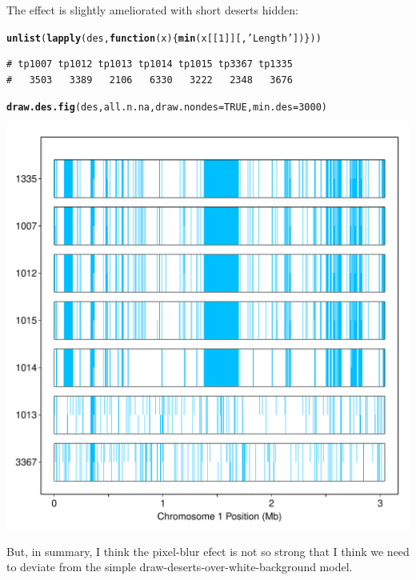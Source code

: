 \documentclass{article}\usepackage[]{graphicx}\usepackage[]{color}
\makeatletter
\def\maxwidth{ %
  \ifdim\Gin@nat@width>\linewidth
    \linewidth
  \else
    \Gin@nat@width
  \fi
}
\newcommand{\hlnum}[1]{\textcolor[rgb]{0.686,0.059,0.569}{#1}}%
\newcommand{\hlstr}[1]{\textcolor[rgb]{0.192,0.494,0.8}{#1}}%
\newcommand{\hlstd}[1]{\textcolor[rgb]{0.345,0.345,0.345}{#1}}%
\newcommand{\hlkwa}[1]{\textcolor[rgb]{0.161,0.373,0.58}{\textbf{#1}}}%
\newcommand{\hlkwc}[1]{\textcolor[rgb]{0.333,0.667,0.333}{#1}}%
\newcommand{\hlkwd}[1]{\textcolor[rgb]{0.737,0.353,0.396}{\textbf{#1}}}%
\newenvironment{kframe}{%
 \def\at@end@of@kframe{}%
 \ifinner\ifhmode%
  \def\at@end@of@kframe{\end{minipage}}%
  \begin{minipage}{\columnwidth}%
 \fi\fi%
 \def\FrameCommand##1{\hskip\@totalleftmargin \hskip-\fboxsep
 \colorbox{shadecolor}{##1}\hskip-\fboxsep
     \hskip-\linewidth \hskip-\@totalleftmargin \hskip\columnwidth}%
 \MakeFramed {\advance\hsize-\width
   \@totalleftmargin\z@ \linewidth\hsize
   \@setminipage}}%
 {\par\unskip\endMakeFramed%
 \at@end@of@kframe}
\newenvironment{knitrout}{}{} %
\makeatother
\begin{document}
The effect is slightly ameliorated with short deserts hidden:

\begin{knitrout}\footnotesize
{}\color{fgcolor}\begin{kframe}
\begin{alltt}
\hlkwd{unlist}\hlstd{(}\hlkwd{lapply}\hlstd{(des,}\hlkwa{function}\hlstd{(}\hlkwc{x}\hlstd{)\{}\hlkwd{min}\hlstd{(x[[}\hlnum{1}\hlstd{]][,}\hlstr{'Length'}\hlstd{])\}))}
\end{alltt}
\begin{verbatim}
# tp1007 tp1012 tp1013 tp1014 tp1015 tp3367 tp1335 
#   3503   3389   2106   6330   3222   2348   3676
\end{verbatim}
\begin{alltt}
\hlkwd{draw.des.fig}\hlstd{(des, all.n.na,} \hlkwc{draw.nondes}\hlstd{=}\hlnum{TRUE}\hlstd{,} \hlkwc{min.des}\hlstd{=}\hlnum{3000}\hlstd{)}
\end{alltt}
\end{kframe}
\includegraphics[width=\maxwidth]{Fig2A-desert-distribution-figs-knitr/unnamed-chunk-23-1} 

\end{knitrout}

But, in summary, I think the pixel-blur efect is not so strong that I think we need to deviate from the simple draw-deserts-over-white-background model.
 
\end{document}
